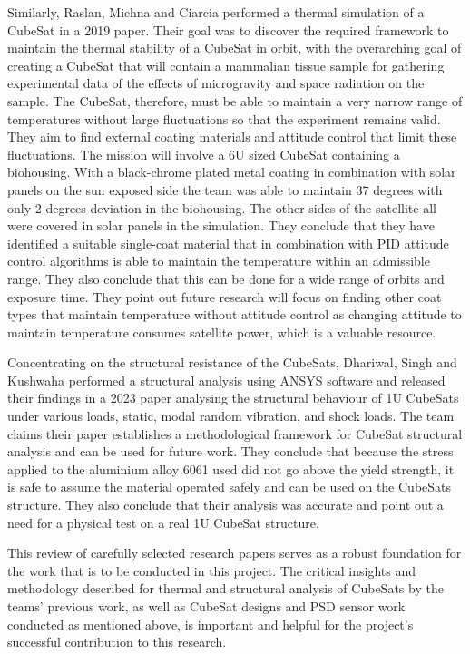 Similarly, Raslan, Michna and Ciarcia performed a thermal simulation of a CubeSat in a 2019 paper. Their goal was to discover the required framework to maintain the thermal stability of a CubeSat in orbit, with the overarching goal of creating a CubeSat that will contain a mammalian tissue sample for gathering experimental data of the effects of microgravity and space radiation on the sample. The CubeSat, therefore, must be able to maintain a very narrow range of temperatures without large fluctuations so that the experiment remains valid. They aim to find external coating materials and attitude control that limit these fluctuations. The mission will involve a 6U sized CubeSat containing a biohousing. With a black-chrome plated metal coating in combination with solar panels on the sun exposed side the team was able to maintain 37 degrees with only 2 degrees deviation in the biohousing. The other sides of the satellite all were covered in solar panels in the simulation. They conclude that they have identified a suitable single-coat material that in combination with PID attitude control algorithms is able to maintain the temperature within an admissible range. They also conclude that this can be done for a wide range of orbits and exposure time. They point out future research will focus on finding other coat types that maintain temperature without attitude control as changing attitude to maintain temperature consumes satellite power, which is a valuable resource.

Concentrating on the structural resistance of the CubeSats, Dhariwal, Singh and Kushwaha performed a structural analysis using ANSYS software and released their findings in a 2023 paper analysing the structural behaviour of 1U CubeSats under various loads, static, modal random vibration, and shock loads. The team claims their paper establishes a methodological framework for CubeSat structural analysis and can be used for future work. They conclude that because the stress applied to the aluminium alloy 6061 used did not go above the yield strength, it is safe to assume the material operated safely and can be used on the CubeSats structure. They also conclude that their analysis was accurate and point out a need for a physical test on a real 1U CubeSat structure.

This review of carefully selected research papers serves as a robust foundation for the work that is to be conducted in this project. The critical insights and methodology described for thermal and structural analysis of CubeSats by the teams' previous work, as well as CubeSat designs and PSD sensor work conducted as mentioned above, is important and helpful for the project's successful contribution to this research.


